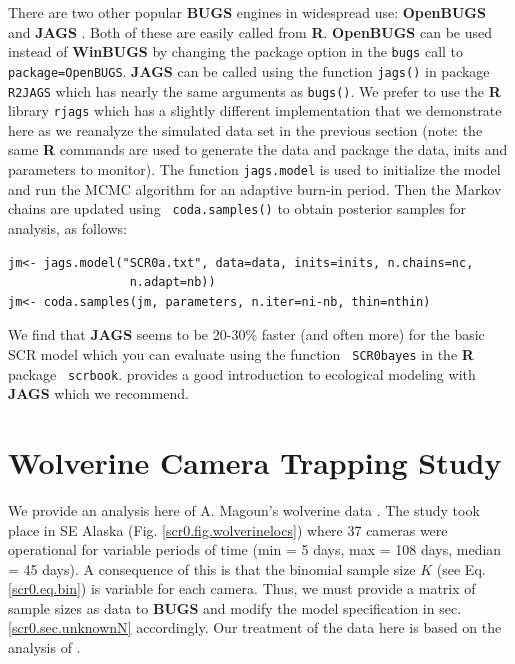 There are two other popular {\bf BUGS} engines in widespread use: {\bf
  OpenBUGS} \citep{thomas_etal:2006} and {\bf JAGS}
\citep{plummer:2003}. Both of these are easily called from {\bf
  R}. {\bf OpenBUGS} can be used instead of {\bf WinBUGS} by changing
the package option in the \mbox{\tt bugs} call to \mbox{\tt
  package=OpenBUGS}.  {\bf JAGS} can be called using the function
\mbox{\tt jags()} in package \mbox{\tt R2JAGS} which has nearly the
same arguments as \mbox{\tt bugs()}.  We prefer to use the {\bf R}
library \mbox{\tt rjags} \citep{plummer:2009} which has a slightly
different implementation that we demonstrate here as we reanalyze the
simulated data set in the previous section (note: the same {\bf R}
commands are used to generate the data and package the data, inits and
parameters to monitor). The function \mbox{\tt jags.model} is used to
initialize the model and run the MCMC algorithm for an adaptive
burn-in period.  Then the Markov chains are updated using \mbox{\tt
  coda.samples()} to obtain posterior samples for analysis, as
follows:
\begin{verbatim}
jm<- jags.model("SCR0a.txt", data=data, inits=inits, n.chains=nc,
                 n.adapt=nb))
jm<- coda.samples(jm, parameters, n.iter=ni-nb, thin=nthin)
\end{verbatim}
We find that {\bf JAGS} seems to be 20-30\% faster (and often more) 
for the basic SCR
model which you can evaluate using the function \mbox{\tt
  SCR0bayes} in the {\bf R} package \mbox{\tt
  scrbook}. \citet{hobbs:2011} provides a good introduction to
ecological modeling with {\bf JAGS} which we recommend. 



\section{Wolverine Camera Trapping Study}
\label{scr0.sec.wolverine}

We provide an analysis here of A. Magoun's wolverine data
\citep{magoun_etal:2011, royle_etal:2011jwm}. The study took place in
SE Alaska (Fig. \ref{scr0.fig.wolverinelocs}) where 37 cameras were
operational for variable periods of time (min = 5 days, max = 108
days, median = 45 days).  A consequence of this is that the binomial
sample size $K$ (see Eq. \ref{scr0.eq.bin}) is variable for each
camera. Thus, we must provide a matrix of sample sizes as data to {\bf
  BUGS} and modify the model specification in
sec. \ref{scr0.sec.unknownN} accordingly. Our treatment of the data
here is based on the analysis of \citet{royle_etal:2011jwm}.

